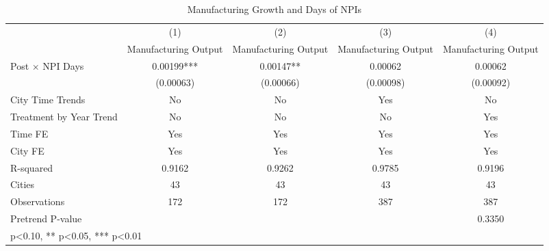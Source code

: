 \begin{table}[htbp]\centering
\def\sym#1{\ifmmode^{#1}\else\(^{#1}\)\fi}
\caption{Manufacturing Growth and Days of NPIs}
\begin{tabular}{l*{4}{c}}
\hline\hline
                    &\multicolumn{1}{c}{(1)}   &\multicolumn{1}{c}{(2)}   &\multicolumn{1}{c}{(3)}   &\multicolumn{1}{c}{(4)}   \\
                    &Manufacturing Output   &Manufacturing Output   &Manufacturing Output   &Manufacturing Output   \\
\hline
Post $\times$ NPI Days&     0.00199***&     0.00147** &     0.00062   &     0.00062   \\
                    &   (0.00063)   &   (0.00066)   &   (0.00098)   &   (0.00092)   \\
City Time Trends    &          No   &          No   &         Yes   &          No   \\
Treatment by Year Trend &          No   &          No   &          No   &         Yes   \\
Time FE             &         Yes   &         Yes   &         Yes   &         Yes   \\
\hline
City FE             &         Yes   &         Yes   &         Yes   &         Yes   \\
R-squared           &      0.9162   &      0.9262   &      0.9785   &      0.9196   \\
Cities              &          43   &          43   &          43   &          43   \\
Observations        &         172   &         172   &         387   &         387   \\
Pretrend P-value    &               &               &               &      0.3350   \\
\hline\hline
\multicolumn{5}{l}{\footnotesize * p<0.10, ** p<0.05, *** p<0.01}\\
\end{tabular}
\end{table}
